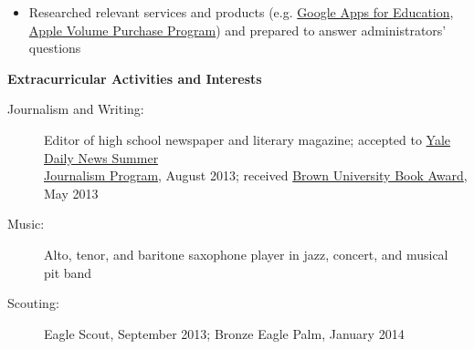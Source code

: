\documentclass[letterpaper,10.6pt]{article}
\makeatletter
\newcommand{\resitem}[1]{\item #1 \vspace{-2pt}}
\newcommand{\resheading}[1]{{\large \colorbox{mygrey}{\begin{minipage}{\textwidth}{\textbf{#1 \vphantom{p\^{E}}}}\end{minipage}}}}
\newcommand{\ressubheading}[4]{
\begin{tabular*}{6.8in}{l@{\extracolsep{\fill}}r}
		\textbf{#1} & #2 \\
		\small{#3} & \small{#4} \\
\end{tabular*}\vspace{-6pt}}
\makeatother
\begin{document}
\begin{itemize}[leftmargin=*]
{\begin{itemize}
					\resitem{Researched relevant services and products (e.g. \href{https://www.google.com/work/apps/education/}{Google Apps for Education}, \href{http://www.apple.com/education/it/vpp/}{Apple Volume Purchase Program}) and prepared to answer administrators' questions}
				\end{itemize}}
	\end{itemize}  %

\resheading{Extracurricular Activities and Interests}
	\begin{description}
		\item[Journalism and Writing:] { \footnotesize Editor of high school newspaper and literary magazine; accepted to \href{http://yaledailynews.com/about-us/sjp/}{Yale Daily News Summer \\ \hspace{3.6cm}Journalism Program}, August 2013; received \href{http://www.brown.edu/campus-life/support/bookstore/book-award}{Brown University Book Award}, May 2013}
		\item[Music:] {\footnotesize Alto, tenor, and baritone saxophone player in jazz, concert, and musical pit band}
		\item[Scouting:] {\footnotesize Eagle Scout, September 2013; Bronze Eagle Palm, January 2014}
		
	\end{description} %
	
\end{document}
